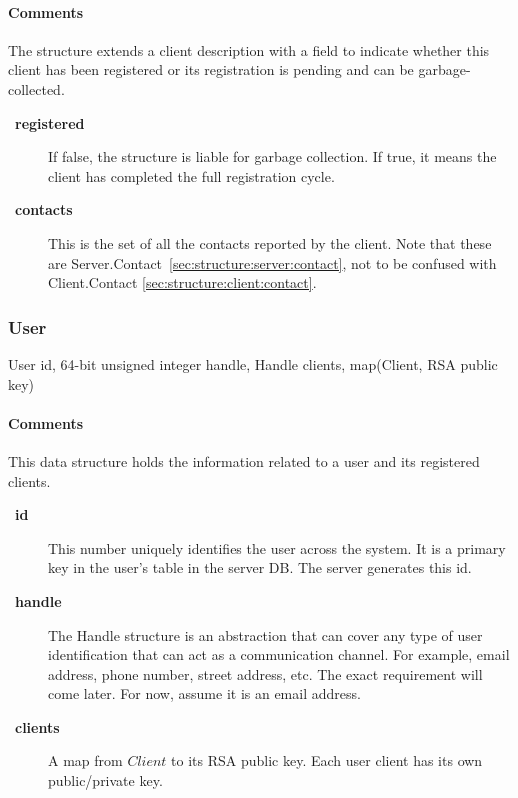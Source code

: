\documentclass[a4paper,10pt,draft]{article}
\let\Item\item
\newcommand\SpecialItem{\renewcommand\item[1][]{\Item[\textbullet~\bfseries##1]}
}
\begin{document}
\paragraph*{Comments}

The structure extends a client description with a field to indicate whether this client has been registered or its registration is pending and can be garbage-collected.

\SpecialItem
\begin{description}
 \item[registered] If false, the structure is liable for garbage collection. If true, it means the client has completed the full registration cycle.
 \item[contacts] This is the set of all the contacts reported by the client. Note that these are Server.Contact~\ref{sec:structure:server:contact}, not to be confused with 
Client.Contact \ref{sec:structure:client:contact}.
\end{description}

\subsubsection{User}
\label{sec:structure:server:user}

\begin{verbbox}
User
{
  id, 64-bit unsigned integer
  handle, Handle
  clients, map(Client, RSA public key)
}
\end{verbbox}
\begin{center}
\theverbbox
\end{center}

\begin{inparaitem}[ ]
 \item \infrastructure
\end{inparaitem}

\paragraph*{Comments}
This data structure holds the information related to a user and its registered clients.

\SpecialItem
\begin{description}
 \item[id] This number uniquely identifies the user across the system. It is a primary key in the user's table in the server DB. The server generates this id.
 \item[handle] The Handle structure is an abstraction that can cover any type of user identification that can act as a communication channel. For example, email address, phone 
number, street address, etc. The exact requirement will come later. For now, assume it is an email address.
 \item[clients] A map from $Client$ to its RSA public key. Each user client has its own public/private key.
\end{description}
\end{document}
